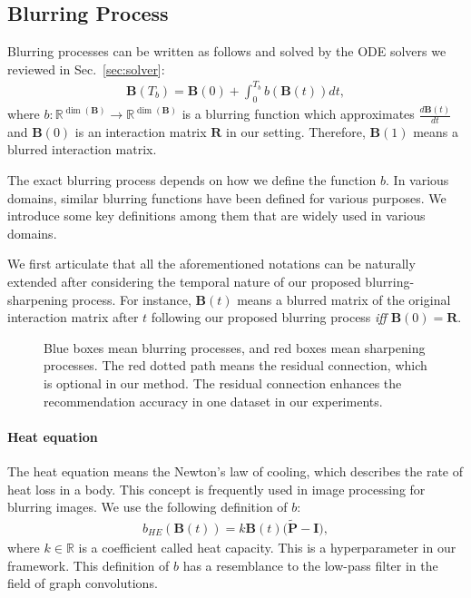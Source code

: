 \documentclass[sigconf,natbib=true]{acmart}
\begin{document}
\subsection{Blurring Process}
Blurring processes can be written as follows and solved by the ODE solvers we reviewed in Sec.~\ref{sec:solver}:
\begin{align}\label{eq:blur}
    \bm{B}(T_b) = \bm{B}(0) + \int_0^{T_b} b(\bm{B}(t)) dt,
\end{align}where $b:\mathbb{R}^{\dim(\bm{B})} \rightarrow \mathbb{R}^{\dim(\bm{B})}$ is a blurring function which approximates $\frac{d\bm{B}(t)}{dt}$ and $\bm{B}(0)$ is an interaction matrix $\bm{R}$ in our setting. Therefore, $\bm{B}(1)$ means a blurred interaction matrix.

The exact blurring process depends on how we define the function $b$. In various domains, similar blurring functions have been defined for various purposes. We introduce some key definitions among them that are widely used in various domains.

We first articulate that all the aforementioned notations can be naturally extended after considering the temporal nature of our proposed blurring-sharpening process. For instance, $\bm{B}(t)$ means a blurred matrix of the original interaction matrix after $t$ following our proposed blurring process \textit{iff} $\bm{B}(0) = \bm{R}$.



\begin{figure}[t]
    \centering
    \caption{Blue boxes mean blurring processes, and red boxes mean sharpening processes. The red dotted path means the residual connection, which is optional in our method. The residual connection enhances the recommendation accuracy in one dataset in our experiments.}
    \label{fig:bspm}
\end{figure}

\paragraph{Heat equation} The heat equation means the Newton's law of cooling, which describes the rate of heat loss in a body. This concept is frequently used in image processing for blurring images. We use the following definition of $b$:
\begin{align}
    b_{HE}(\bm{B}(t)) = k\bm{B}(t)\big(\tilde{\bm{P}} - \bm{I}\big),
\end{align}where $k \in \mathbb{R}$ is a coefficient called heat capacity. This is a hyperparameter in our framework. This definition of $b$ has a resemblance to the low-pass filter in the field of graph convolutions.
\end{document}
